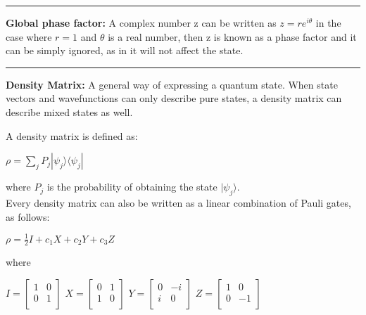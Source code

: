 \documentclass{article}
\begin{document}
\hrule 
\vspace{5pt}

\newpage
\textbf{Global phase factor:}
A complex number z can be written as $z = re^{i\theta} $ in the case where $ r= 1$ and $\theta$ is a real number, then z is known as a phase factor and it can be simply ignored, as in it will not affect the state.

\vspace{5pt}
\hrule 
\vspace{5pt}

\textbf{Density Matrix:} A general way of expressing a quantum state.
When state vectors and wavefunctions can only describe pure states, a density matrix can describe mixed states as well. 

A density matrix is defined as:

\begin{center}
$ \displaystyle \rho = \sum_{j} P_{j}  |{\psi}_{j} \rangle \langle{\psi}_{j} | $
\end{center}
where $P_{j}$ is the probability of obtaining the state $|\psi_{j} \rangle$. \\

Every density matrix can also be written as a linear combination of Pauli gates, as follows:

\begin{center}
$\rho = \frac{1}{2} I + c_{1} X + c_{2}Y + c_{3}Z$ \\ 
\end{center}

where
\begin{center}
$
  I =
  \left[ {\begin{array}{cc}
    1 & 0 \\
    0 & 1 \\
  \end{array} } \right] 
$
\quad
$
  X = \left[ {\begin{array}{cc}
    0 & 1 \\
    1 & 0 \\
  \end{array} } \right]
$
\quad
$
 Y = \left[ {\begin{array}{cc}
    0 & -i \\
    i & 0 \\
  \end{array} } \right]
$
\quad
$
  Z = \left[ {\begin{array}{cc}
    1 & 0 \\
    0 & -1 \\
  \end{array} } \right]
$

\end{center}
\end{document}
